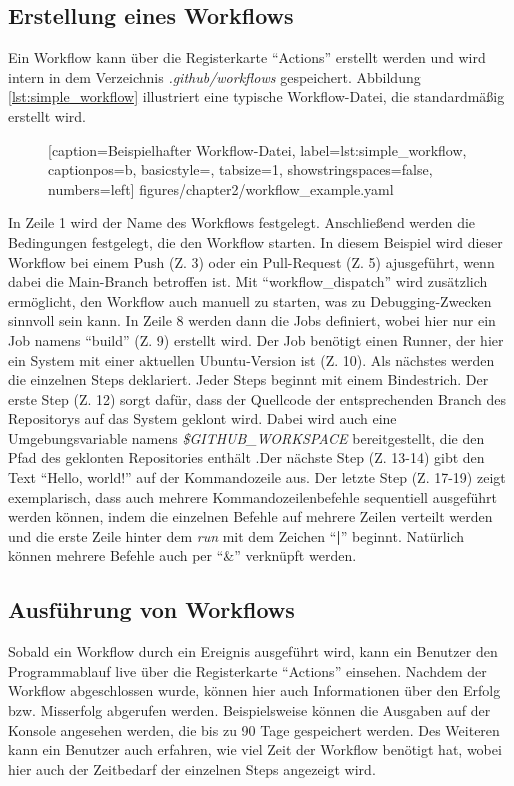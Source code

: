 \subsection{Erstellung eines Workflows}
Ein Workflow kann über die Registerkarte \enquote{Actions} erstellt werden und wird intern in dem Verzeichnis \textit{.github/workflows} gespeichert. Abbildung \ref{lst:simple_workflow} illustriert eine typische Workflow-Datei, die standardmäßig erstellt wird.


\begin{figure}[h!]
	
			[caption={Beispielhafter Workflow-Datei},
			label={lst:simple_workflow},
			captionpos=b, basicstyle=\footnotesize, tabsize=1, showstringspaces=false,  numbers=left]
			{figures/chapter2/workflow_example.yaml}
			\end{figure}
In Zeile 1 wird der Name des Workflows festgelegt. Anschließend werden die Bedingungen festgelegt, die den Workflow starten. In diesem Beispiel wird dieser Workflow bei einem Push (Z. 3) oder ein Pull-Request (Z. 5) ajusgeführt, wenn dabei die Main-Branch betroffen ist. Mit \enquote{workflow\_dispatch} wird zusätzlich ermöglicht, den Workflow auch manuell zu starten, was zu Debugging-Zwecken sinnvoll sein kann. In Zeile 8 werden dann die Jobs definiert, wobei hier nur ein Job namens \enquote{build} (Z. 9) erstellt wird. Der Job benötigt einen Runner, der hier ein System mit einer aktuellen Ubuntu-Version ist (Z. 10). Als nächstes werden die einzelnen Steps deklariert. Jeder Steps beginnt mit einem Bindestrich. Der erste Step (Z. 12) sorgt dafür, dass der Quellcode der entsprechenden Branch des Repositorys auf das System geklont wird. Dabei wird auch eine Umgebungsvariable namens \textit{\$GITHUB\_WORKSPACE} bereitgestellt, die den Pfad des geklonten Repositories enthält .Der nächste Step (Z. 13-14) gibt den Text \enquote{Hello, world!} auf der Kommandozeile aus. Der letzte Step (Z. 17-19) zeigt exemplarisch, dass auch mehrere Kommandozeilenbefehle sequentiell ausgeführt  werden können, indem die einzelnen Befehle auf  mehrere Zeilen verteilt werden und die erste Zeile hinter dem \textit{run} mit dem Zeichen \enquote{\textbf{|}} beginnt. Natürlich können mehrere Befehle auch per \enquote{\&} verknüpft werden. 
	\subsection{Ausführung von Workflows}
Sobald ein Workflow durch ein Ereignis ausgeführt wird, kann ein Benutzer den Programmablauf live über die Registerkarte \enquote{Actions} einsehen. Nachdem der Workflow abgeschlossen wurde, können hier auch Informationen über den Erfolg bzw. Misserfolg abgerufen werden. Beispielsweise können die Ausgaben auf der Konsole angesehen werden, die bis zu 90 Tage gespeichert werden.  Des Weiteren kann ein Benutzer auch erfahren, wie viel Zeit der Workflow benötigt hat, wobei hier auch der Zeitbedarf der einzelnen Steps angezeigt wird. 

